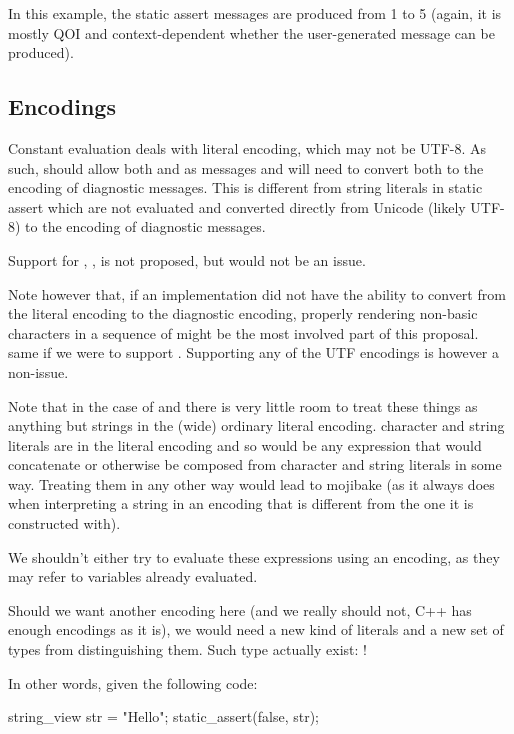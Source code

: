 \documentclass{wg21}
\begin{document}
In this example, the static assert messages are produced from 1 to 5 (again, it is mostly QOI and context-dependent whether the user-generated message can be produced).

\subsection{Encodings}

Constant evaluation deals with literal encoding, which may not be UTF-8.
As such,  should allow both  and  as messages and will need to convert both to the encoding of diagnostic messages.
This is different from string literals in static assert which are not evaluated and converted directly from Unicode (likely UTF-8) to the encoding of diagnostic messages.

Support for , ,  is not proposed, but would not be an issue.

Note however that, if an implementation did not have the ability to convert from the literal encoding to the diagnostic encoding,
properly rendering non-basic characters in a sequence of  might be the most involved part of this proposal. same if we were to support .
Supporting any of the UTF encodings is however a non-issue.

Note that in the case of  and  there is very little room to treat these things as anything but strings in the (wide) ordinary literal encoding.
character and string literals are in the literal encoding and so would be any expression that would concatenate or otherwise be composed from
character and string literals in some way.
Treating them in any other way would lead to mojibake (as it always does when interpreting a string in an encoding that is different from the one it is constructed with).

We shouldn't either try to evaluate these expressions using an encoding, as they may refer to variables already evaluated.

Should we want another encoding here (and we really should not, C++ has enough encodings as it is), we would need a new kind of literals and a new set of types from distinguishing them. Such type actually exist: !

In other words, given the following code:

\begin{colorblock}
string_view str = "Hello";
static_assert(false, str);
\end{colorblock}
\end{document}
